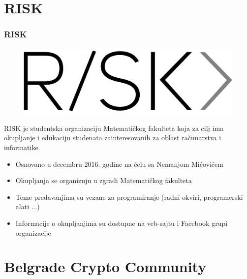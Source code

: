\documentclass[hyperref={bookmarks=false},aspectratio=169]{beamer}
\begin{document}
\section{RISK}

\begin{frame}
\frametitle{RISK}

\vspace{-8mm}
\begin{figure}
    \raggedright
    \includegraphics[scale=0.060]{./images/riskmatf.png}
\end{figure}

RISK je studentska organizaciju Matematičkog fakulteta koja za cilj ima 
okupljanje i edukaciju studenata zainteresovanih za oblast računarstva i informatike.


\begin{itemize}
    \item Osnovano u decembru 2016. godine na čelu sa Nemanjom Mićovićem
    \item Okupljanja se organizuju u zgradi Matematičkog fakulteta
    \item Teme predavanjima su vezane za programiranje (radni okviri, programerski alati ...) 
    \item Informacije o okupljanjima su dostupne na veb-sajtu i Facebook grupi organizacije
\end{itemize}

\end{frame}


\section{Belgrade Crypto Community}
\end{document}
